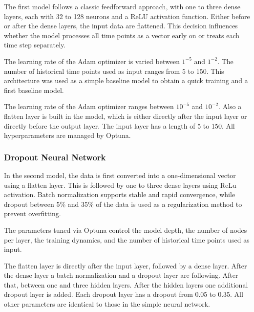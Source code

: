 The first model follows a classic feedforward approach, with one to three dense layers, each with 32 to 128 neurons and a ReLU activation function.
Either before or after the dense layers, the input data are flattened.
This decision influences whether the model processes all time points as a vector early on or treats each time step separately.

The learning rate of the Adam optimizer is varied between $1^{-5}$ and $1^{-2}$.
The number of historical time points used as input ranges from $5$ to $150$.
This architecture was used as a simple baseline model to obtain a quick training and a first baseline model.

The learning rate of the Adam optimizer ranges between $10^{-5}$ and $10^{-2}$.
Also a flatten layer is built in the model, which is either directly after the input layer or directly before the output layer.
The input layer has a length of 5 to 150.
All hyperparameters are managed by Optuna.



\subsubsection{Dropout Neural Network}

In the second model, the data is first converted into a one-dimensional vector using a flatten layer.
This is followed by one to three dense layers using ReLu activation.
Batch normalization supports stable and rapid convergence, while dropout between 5\% and 35\% of the data is used as a regularization method to prevent overfitting.

The parameters tuned via Optuna control the model depth, the number of nodes per layer, the training dynamics, and the number of historical time points used as input.

The flatten layer is directly after the input layer, followed by a dense layer.
After the dense layer a batch normalization and a dropout layer are following.
After that, between one and three hidden layers.
After the hidden layers one additional dropout layer is added.
Each dropout layer has a dropout from 0.05 to 0.35.
All other parameters are identical to those in the simple neural network.

